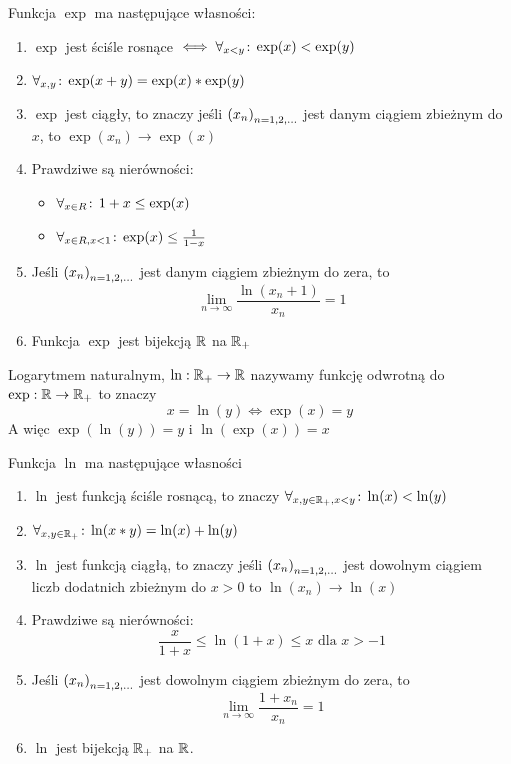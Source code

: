 \documentclass[9pt]{article}
\begin{document}
\begin{Twi} 
    Funkcja $\exp$ ma następujące własności:
    \begin{enumerate}
        \item $\exp$ jest ściśle rosnące $\iff \forall_{x < y} \! : \, \exp(x) < \exp(y)$
        \item $\forall_{x,y} \! : \, \exp(x+y) = \exp(x) * \exp(y)$
        \item $\exp$ jest ciągły, to znaczy jeśli $\left(x_n\right)_{n = 1,2,...}$ jest danym ciągiem zbieżnym do $x$, to
            $\exp(x_n) \to \exp(x)$
        \item Prawdziwe są nierówności:
            \begin{itemize}
                \item $\forall_{x \in R} \! : \, 1 + x \le \exp(x)$
                \item $\forall_{x \in R, x < 1} \! : \, \exp(x) \le \frac{1}{1-x}$
            \end{itemize}
        \item Jeśli $\left(x_n\right)_{n = 1,2,...}$ jest danym ciągiem zbieżnym do zera, to
            \[
                \lim_{n \to \infty} \frac{\ln(x_n+1)}{x_n} = 1
            \]
        \item Funkcja $\exp$ jest bijekcją $\mathbb{R}$ na $\mathbb{R}_+$
    \end{enumerate}
\end{Twi}

\begin{Def}
    Logarytmem naturalnym, $\ln: \mathbb{R}_+ \to \mathbb{R}$ nazywamy funkcję odwrotną do $\exp: \mathbb{R} \to \mathbb{R}_+$ to
    znaczy
    \[
        x = \ln(y) \iff \exp(x) = y 
    \]
    A więc $\exp(\ln(y)) = y$ i $\ln(\exp(x)) = x$
\end{Def}

\begin{Twi}
    Funkcja $\ln$ ma następujące własności
    \begin{enumerate}
        \item $\ln$ jest funkcją ściśle rosnącą, to znaczy $\forall_{x, y \in \mathbb{R}_+, x < y} \! : \, \ln(x) <
            \ln(y)$
        \item $\forall_{x, y \in \mathbb{R}_+} \! : \, \ln(x*y) = \ln(x) + \ln(y)$
        \item $\ln$ jest funkcją ciągłą, to znaczy jeśli $\left(x_n\right)_{n = 1,2,...}$ jest dowolnym ciągiem liczb
            dodatnich zbieżnym do $x > 0$ to $\ln(x_n) \to \ln(x)$
        \item Prawdziwe są nierówności:
            \[
                \frac{x}{1+x} \le \ln(1+x) \le x \text{ dla } x > -1
            \]
        \item Jeśli $\left(x_n\right)_{n = 1,2,...}$ jest dowolnym ciągiem zbieżnym do zera, to
            \[
                \lim_{n \to \infty} \frac{1+x_n}{x_n} = 1
            \]
        \item $\ln$ jest bijekcją $\mathbb{R}_+$ na $\mathbb{R}$.
    \end{enumerate}
\end{Twi}
\end{document}
